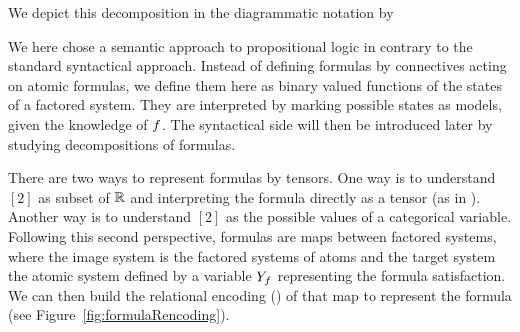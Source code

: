 We depict this decomposition in the diagrammatic notation by
\begin{center}
	
\end{center}









We here chose a semantic approach to propositional logic in contrary to the standard syntactical approach.
Instead of defining formulas by connectives acting on atomic formulas, we define them here as binary valued functions of the states of a factored system.
They are interpreted by marking possible states as models, given the knowledge of $f$.
The syntactical side will then be introduced later by studying decompositions of formulas.


%	




There are two ways to represent formulas by tensors.
One way is to understand $[2]$ as subset of $\mathbb{R}$ and interpreting the formula directly as a tensor (as in ).
Another way is to understand $[2]$ as the possible values of a categorical variable.
Following this second perspective, formulas are maps between factored systems, where the image system is the factored systems of atoms and the target system the atomic system defined by a variable $Y_{f}$ representing the formula satisfaction.
We can then build the relational encoding () of that map to represent the formula (see Figure~\ref{fig:formulaRencoding}).

